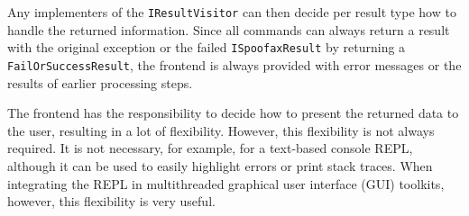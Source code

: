 Any implementers of the \texttt{IResultVisitor} can then decide per result type
how to handle the returned information. Since all commands can always return a
result with the original exception or the failed \texttt{ISpoofaxResult} by
returning a \texttt{FailOrSuccessResult}, the frontend is always provided with
error messages or the results of earlier processing steps.

The frontend has the responsibility to decide how to present the returned data
to the user, resulting in a lot of flexibility. However, this flexibility is not
always required. It is not necessary, for example, for a text-based console
REPL, although it can be used to easily highlight errors or print stack
traces. When integrating the REPL in multithreaded graphical user interface
(GUI) toolkits, however, this flexibility is very useful.

